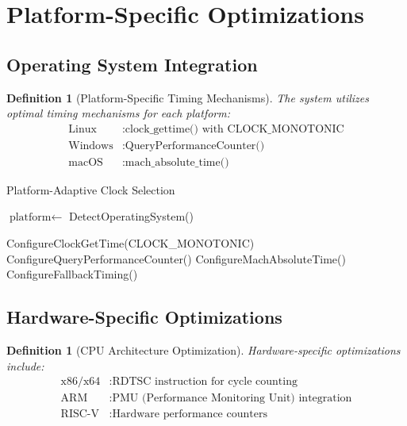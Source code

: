 \documentclass[12pt,a4paper]{article}
\newtheorem{definition}[theorem]{Definition}
\begin{document}
\section{Platform-Specific Optimizations}

\subsection{Operating System Integration}

\begin{definition}[Platform-Specific Timing Mechanisms]
The system utilizes optimal timing mechanisms for each platform:
\begin{align}
\text{Linux} &: \text{clock\_gettime()} \text{ with CLOCK\_MONOTONIC} \\
\text{Windows} &: \text{QueryPerformanceCounter()} \\
\text{macOS} &: \text{mach\_absolute\_time()}
\end{align}
\end{definition}

\begin{algorithm}[H]
\caption{Platform-Adaptive Clock Selection}
\begin{algorithmic}[1]
    \State $\text{platform} \gets$ DetectOperatingSystem()

        \State \Return ConfigureClockGetTime(CLOCK\_MONOTONIC)
        \State \Return ConfigureQueryPerformanceCounter()
        \State \Return ConfigureMachAbsoluteTime()
    \Else
        \State \Return ConfigureFallbackTiming()
    \EndIf
\EndProcedure
\end{algorithmic}
\end{algorithm}

\subsection{Hardware-Specific Optimizations}

\begin{definition}[CPU Architecture Optimization]
Hardware-specific optimizations include:
\begin{align}
\text{x86/x64} &: \text{RDTSC instruction for cycle counting} \\
\text{ARM} &: \text{PMU (Performance Monitoring Unit) integration} \\
\text{RISC-V} &: \text{Hardware performance counters}
\end{align}
\end{definition}
\end{document}

